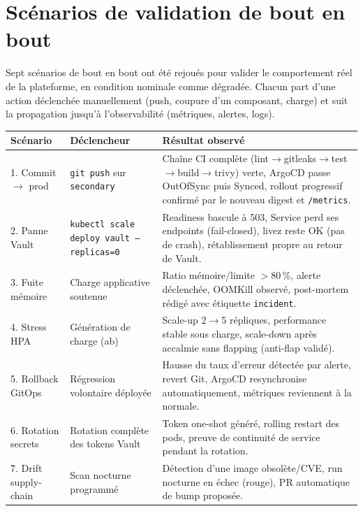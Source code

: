 \documentclass[12pt,a4paper,oneside]{report}
\begin{document}
\clearpage
\chapter[Sc\'enarios de validation]{Sc\'enarios de validation de bout en bout}

Sept sc\'enarios de bout en bout ont \'et\'e rejou\'es pour valider le comportement r\'eel de la plateforme, en condition nominale comme d\'egrad\'ee. Chacun part d'une action d\'eclench\'ee manuellement (push, coupure d'un composant, charge) et suit la propagation jusqu'\`a l'observabilit\'e (m\'etriques, alertes, logs).

\begin{center}\label{tab:scenarios-synthese}\end{center}
\begin{longtable}{@{}p{2.4cm}p{6.0cm}p{6.4cm}@{}}
\toprule
\textbf{Sc\'enario} & \textbf{D\'eclencheur} & \textbf{R\'esultat observ\'e} \\
\midrule
\endhead
1. Commit $\to$ prod & \texttt{git push} sur \texttt{secondary} & Chaîne CI compl\`ete (lint$\to$gitleaks$\to$test$\to$build$\to$trivy) verte, ArgoCD passe OutOfSync puis Synced, rollout progressif confirm\'e par le nouveau digest et \texttt{/metrics}. \\
2. Panne Vault & \texttt{kubectl scale deploy vault --replicas=0} & Readiness bascule \`a 503, Service perd ses endpoints (fail-closed), livez reste OK (pas de crash), r\'etablissement propre au retour de Vault. \\
3. Fuite m\'emoire & Charge applicative soutenue & Ratio m\'emoire/limite $>$80\,\%, alerte d\'eclench\'ee, OOMKill observ\'e, post-mortem r\'edig\'e avec \'etiquette \texttt{incident}. \\
4. Stress HPA & G\'en\'eration de charge (ab) & Scale-up 2$\to$5 r\'epliques, performance stable sous charge, scale-down apr\`es accalmie sans flapping (anti-flap valid\'e). \\
5. Rollback GitOps & R\'egression volontaire d\'eploy\'ee & Hausse du taux d'erreur d\'etect\'ee par alerte, revert Git, ArgoCD resynchronise automatiquement, m\'etriques reviennent \`a la normale. \\
6. Rotation secrets & Rotation compl\`ete des tokens Vault & Token one-shot g\'en\'er\'e, rolling restart des pods, preuve de continuit\'e de service pendant la rotation. \\
7. Drift supply-chain & Scan nocturne programm\'e & D\'etection d'une image obsol\`ete/CVE, run nocturne en \'echec (rouge), PR automatique de bump propos\'ee. \\
\bottomrule
\end{longtable}
\end{document}

